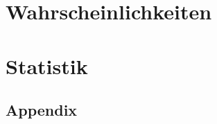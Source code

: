 \documentclass[8pt]{article}
\begin{document}
\begin{multicols*}{4}
    \raggedright
    
    \clearpage
    \part{Wahrscheinlichkeiten}
    
    
    
    
    \clearpage
    \part{Statistik}
    
    
    
    
\end{multicols*}
\begin{multicols*}{3}
    \raggedcolumns
    \part{Appendix}
    
\end{multicols*}
\end{document}
